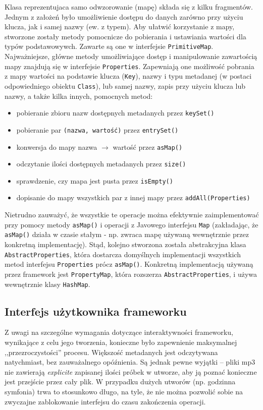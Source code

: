 Klasa reprezentujaca samo odwzorowanie (mapę) składa się z kilku fragmentów. Jednym z założeń było
umożliwienie dostępu do danych zarówno przy użyciu klucza, jak i samej nazwy (ew. z typem). Aby
ułatwić korzystanie z mapy, stworzone zostały metody pomocnicze do pobierania i ustawiania wartości
dla typów podstawowywch. Zawarte są one w interfejsie \texttt{PrimitiveMap}. Najważniejsze, główne
metody umożliwiające dostęp i manipulowanie zawartością mapy znajdują się w interfejsie
\texttt{Properties}. Zapewniają one możliwość pobrania z mapy wartości na podstawie klucza
(\texttt{Key}), nazwy i typu metadanej (w postaci odpowiedniego obiektu \texttt{Class}), lub samej
nazwy, zapis przy użyciu klucza lub nazwy, a także kilka innych, pomocnych metod:

\begin{itemize}
  \item pobieranie zbioru nazw dostępnych metadanych przez \texttt{keySet()}
  \item pobieranie par \texttt{(nazwa, wartość)} przez \texttt{entrySet()} 
  \item konwersja do mapy nazwa $\to$ wartość przez \texttt{asMap()}
  \item odczytanie ilości dostępnych metadanych przez \texttt{size()}
  \item sprawdzenie, czy mapa jest pusta przez \texttt{isEmpty()}
  \item dopisanie do mapy wszystkich par z innej mapy przez \texttt{addAll(Properties)}
\end{itemize}

Nietrudno zauważyć, że wszystkie te operacje można efektywnie zaimplementować przy pomocy metody
\texttt{asMap()} i operacji z Javowego interfejsu \texttt{Map} (zakładając, że \texttt{asMap()}
działa w czasie stałym - np. zwraca mapę używaną wewnętrznie przez konkretną implementację). Stąd,
kolejno stworzona została abstrakcyjna klasa \texttt{AbstractProperties}, która dostarcza domyślnych
implementacji wszystkich metod interfejsu \texttt{Properties} prócz \texttt{asMap()}. Konkretną
implementacją używaną przez framework jest \texttt{PropertyMap}, która rozszerza
\texttt{AbstractProperties}, i używa wewnętrznie klasy \texttt{HashMap}.


\subsection{Interfejs użytkownika frameworku}

Z uwagi na szczególne wymagania dotyczące interaktywności frameworku, wynikające z celu jego
tworzenia, konieczne było zapewnienie maksymalnej ,,przezroczystości'' procesu.  Większość
metadanych jest odczytywana natychmiast, bez zauważalnego opóźnienia. Są jednak pewne wyjątki --
pliki mp3 nie zawierają \textit{explicite} zapisanej ilości próbek w utworze, aby ją poznać
konieczne jest przejście przez cały plik. W przypadku dużych utworów (np. godzinna symfonia) trwa to
stosunkowo długo, na tyle, że nie można pozwolić sobie na zwyczajne zablokowanie interfejsu do czasu
zakończenia operacji.

